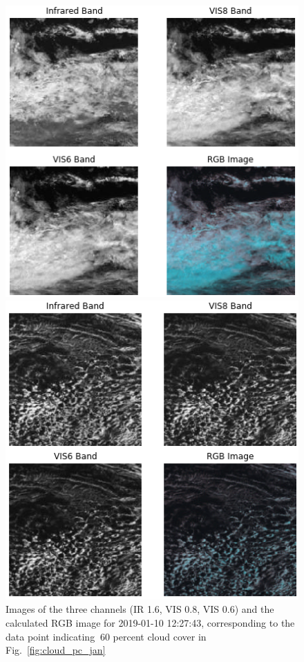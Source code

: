 \begin{figure}[!hbt]
    \begin{minipage}{0.48\textwidth}
        \centering
        \includegraphics[width=1\textwidth]{60_per_day_sea_not.png}
        \caption{Images of the three channels (IR 1.6, VIS 0.8, VIS 0.6) and the calculated RGB image for 2019-01-10 12:27:43, corresponding to the data point indicating $~$60 percent cloud cover in Fig.~\ref{fig:cloud_pc_jan}}
        \label{fig:60pc}
    \end{minipage}\hfill
    \begin{minipage}{0.48\textwidth}
        \centering
        \includegraphics[width=1\textwidth]{15_per_day_sea_outlier_not.png}

\end{minipage}
\end{figure}

